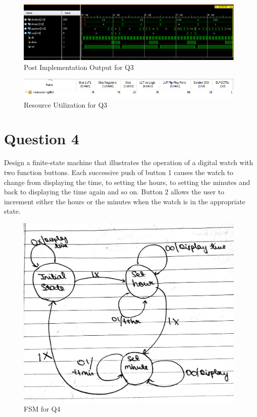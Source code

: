 \documentclass[11pt,a4paper]{article}
\begin{document}
	 
	 \begin{figure}[H]
	 	\centering
	 	\includegraphics[width=1\linewidth]{images/q3output}
	 	\caption[]{Post Implementation Output for Q3}
	 	\label{fig:q3output}
	 \end{figure}
	 \begin{figure}[H]
	 	\centering
	 	\includegraphics[width=1\linewidth]{images/q3utilization}
	 	\caption[]{Resource Utilization for Q3}
	 	\label{fig:q3utilization}
	 \end{figure}
 
 	\section*{Question 4}
 	Design a finite-state machine that illustrates the operation of a digital watch with two function buttons. Each successive push of button 1 causes the watch to change from displaying the time, to setting the hours, to setting the minutes and back to displaying the time again and so on. Button 2 allows the user to increment either the hours or the minutes when the watch is in the appropriate state.
	\begin{figure}[H]
		\centering
		\includegraphics[scale=0.12]{images/q4fsm}
		\caption[]{FSM for Q4}
		\label{fig:q4fsm}
	\end{figure}
	
\end{document}
